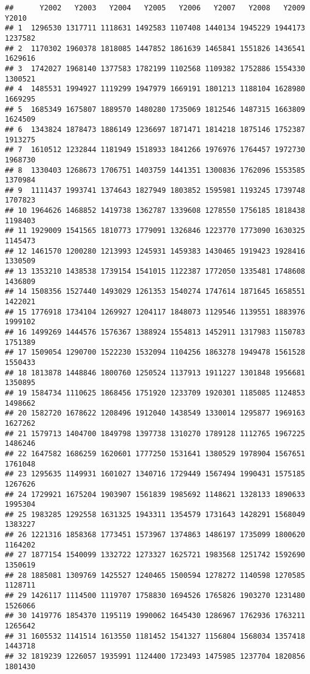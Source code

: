 \documentclass[
]{article}
\begin{document}
\begin{verbatim}
##      Y2002   Y2003   Y2004   Y2005   Y2006   Y2007   Y2008   Y2009   Y2010
## 1  1296530 1317711 1118631 1492583 1107408 1440134 1945229 1944173 1237582
## 2  1170302 1960378 1818085 1447852 1861639 1465841 1551826 1436541 1629616
## 3  1742027 1968140 1377583 1782199 1102568 1109382 1752886 1554330 1300521
## 4  1485531 1994927 1119299 1947979 1669191 1801213 1188104 1628980 1669295
## 5  1685349 1675807 1889570 1480280 1735069 1812546 1487315 1663809 1624509
## 6  1343824 1878473 1886149 1236697 1871471 1814218 1875146 1752387 1913275
## 7  1610512 1232844 1181949 1518933 1841266 1976976 1764457 1972730 1968730
## 8  1330403 1268673 1706751 1403759 1441351 1300836 1762096 1553585 1370984
## 9  1111437 1993741 1374643 1827949 1803852 1595981 1193245 1739748 1707823
## 10 1964626 1468852 1419738 1362787 1339608 1278550 1756185 1818438 1198403
## 11 1929009 1541565 1810773 1779091 1326846 1223770 1773090 1630325 1145473
## 12 1461570 1200280 1213993 1245931 1459383 1430465 1919423 1928416 1330509
## 13 1353210 1438538 1739154 1541015 1122387 1772050 1335481 1748608 1436809
## 14 1508356 1527440 1493029 1261353 1540274 1747614 1871645 1658551 1422021
## 15 1776918 1734104 1269927 1204117 1848073 1129546 1139551 1883976 1999102
## 16 1499269 1444576 1576367 1388924 1554813 1452911 1317983 1150783 1751389
## 17 1509054 1290700 1522230 1532094 1104256 1863278 1949478 1561528 1550433
## 18 1813878 1448846 1800760 1250524 1137913 1911227 1301848 1956681 1350895
## 19 1584734 1110625 1868456 1751920 1233709 1920301 1185085 1124853 1498662
## 20 1582720 1678622 1208496 1912040 1438549 1330014 1295877 1969163 1627262
## 21 1579713 1404700 1849798 1397738 1310270 1789128 1112765 1967225 1486246
## 22 1647582 1686259 1620601 1777250 1531641 1380529 1978904 1567651 1761048
## 23 1295635 1149931 1601027 1340716 1729449 1567494 1990431 1575185 1267626
## 24 1729921 1675204 1903907 1561839 1985692 1148621 1328133 1890633 1995304
## 25 1983285 1292558 1631325 1943311 1354579 1731643 1428291 1568049 1383227
## 26 1221316 1858368 1773451 1573967 1374863 1486197 1735099 1800620 1164202
## 27 1877154 1540099 1332722 1273327 1625721 1983568 1251742 1592690 1350619
## 28 1885081 1309769 1425527 1240465 1500594 1278272 1140598 1270585 1128711
## 29 1426117 1114500 1119707 1758830 1694526 1765826 1903270 1231480 1526066
## 30 1419776 1854370 1195119 1990062 1645430 1286967 1762936 1763211 1265642
## 31 1605532 1141514 1613550 1181452 1541327 1156804 1568034 1357418 1443718
## 32 1819239 1226057 1935991 1124400 1723493 1475985 1237704 1820856 1801430

\end{verbatim}
\end{document}
